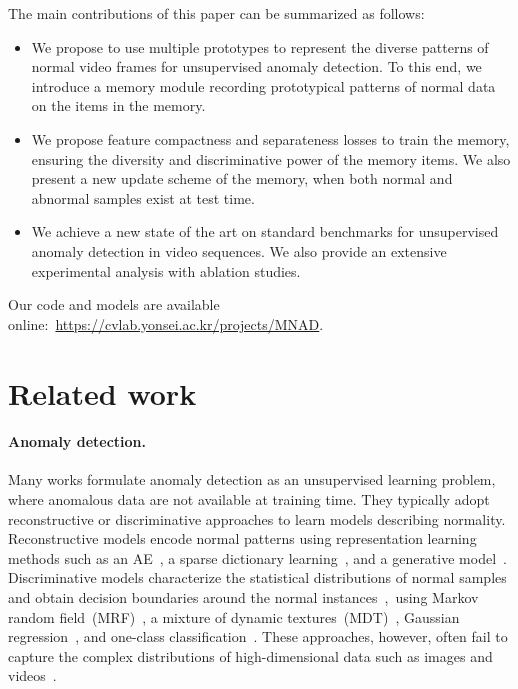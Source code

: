 \documentclass[10pt,twocolumn,letterpaper]{article}
\begin{document}
The main contributions of this paper can be summarized as follows: \vspace{-0.2cm}
	\begin{itemize}[leftmargin=*]
		\item We propose to use multiple prototypes to represent the diverse patterns of normal video frames for unsupervised anomaly detection. To this end, we introduce a memory module recording prototypical patterns of normal data on the items in the memory.
\vspace{-0.2cm}
		\item We propose feature compactness and separateness losses to train the memory, ensuring the diversity and discriminative power of the memory items. We also present a new update scheme of the memory, when both normal and abnormal samples exist at test time. 
\vspace{-0.2cm}
		\item We achieve a new state of the art on standard benchmarks for unsupervised anomaly detection in video sequences. We also provide an extensive experimental analysis with ablation studies. 
	\end{itemize}
\vspace{-0.2cm}
Our code and models are available online:~\url{https://cvlab.yonsei.ac.kr/projects/MNAD}.


\vspace{-0.1cm}
\section{Related work}
\vspace{-0.1cm}
	\paragraph{Anomaly detection.}
		Many works formulate anomaly detection as an unsupervised learning problem, where anomalous data are not available at training time. They typically adopt reconstructive or discriminative approaches to learn models describing normality. Reconstructive models encode normal patterns using representation learning methods such as an AE~\cite{zhai2016deep,sabokrou2015real}, a sparse dictionary learning~\cite{cong2011sparse,zhao2011online,lu2013abnormal}, and a generative model~\cite{vaswani2005shape}. Discriminative models characterize the statistical distributions of normal samples and obtain decision boundaries around the normal instances~\eg,~using Markov random field~(MRF)~\cite{kim2009observe}, a mixture of dynamic textures~(MDT)~\cite{mahadevan2010anomaly}, Gaussian regression~\cite{cheng2015video}, and one-class classification~\cite{scholkopf2001estimating,ma2003time,kaltsa2015swarm}. These approaches, however, often fail to capture the complex distributions of high-dimensional data such as images and videos~\cite{chalapathy2019deep}.
\end{document}
